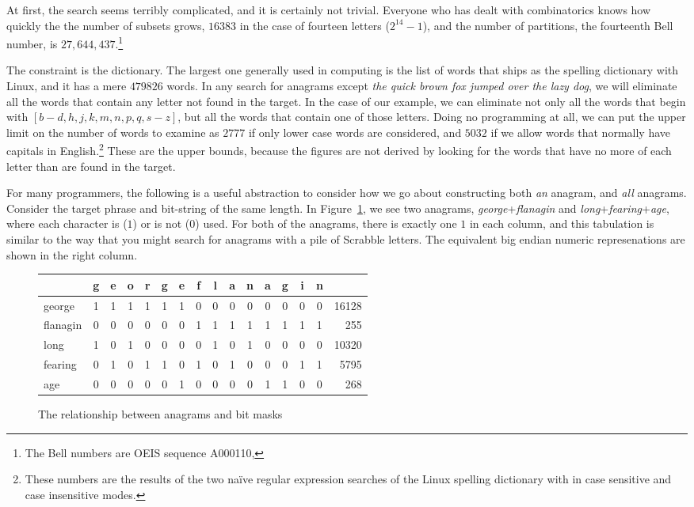 \documentclass[letterpaper, 11pt]{article}
\begin{document}
At first, the search seems terribly complicated, and it is certainly
not trivial. Everyone who has dealt with combinatorics knows how
quickly the the number of subsets grows, $16383$ in the case of
fourteen letters (\ie $2^{14}-1$), and the number of partitions, the fourteenth Bell
number, is $27,644,437$.\footnote{The Bell numbers are OEIS sequence
A000110, }

The constraint is the dictionary. The largest one generally used
in computing is the list of words that ships as the spelling
dictionary with Linux, and it has a mere $479826$ words. In any
search for anagrams except \emph{the quick brown fox jumped over
the lazy dog}, we will eliminate all the words that contain any
letter not found in the target. In the case of our example, we can
eliminate not only all the words that begin with $[b-d,h,j,k,m,n,p,q,s-z]$,
but all the words that contain one of those letters. Doing no
programming at all, we can put the upper limit on the number of
words to examine as $2777$ if only lower case words are considered,
and $5032$ if we allow words that normally have capitals in
English.\footnote{These numbers are the results of the two na\"ive
regular expression searches of the Linux spelling dictionary with
\lit{\textasciicircum[aegnfilor]\textbackslash+\$} in case sensitive
and case insensitive modes.} These are the upper bounds, because
the figures are not derived by looking for the words that have no
more of each letter than are found in the target.

For many programmers, the following is a useful abstraction to
consider how we go about constructing both \emph{an} anagram, and
\emph{all} anagrams.  Consider the target phrase and bit-string of
the same length. In Figure~\ref{fig:bitmask}, we see two anagrams,
\emph{george}+\emph{flanagin} and \emph{long}+\emph{fearing}+\emph{age},
where each character is ($1$) or is not ($0$) used. For both of the
anagrams, there is exactly one $1$ in each column, and this tabulation
is similar to the way that you might search for anagrams with a
pile of Scrabble\CircleR\xspace letters. The equivalent big endian
numeric represenations are shown in the right column.

\begin{figure}
\begin{center}
\begin{tabular}{lccccccccccccccr}
\toprule
 &g&e&o&r&g&e&f&l&a&n&a&g&i&n&\\
\midrule
george&1&1&1&1&1&1&0&0&0&0&0&0&0&0&16128\\
flanagin&0&0&0&0&0&0&1&1&1&1&1&1&1&1&255\\
\midrule
long&1&0&1&0&0&0&0&1&0&1&0&0&0&0&10320\\
fearing&0&1&0&1&1&0&1&0&1&0&0&0&1&1&5795\\
age&0&0&0&0&0&1&0&0&0&0&1&1&0&0&268\\
\bottomrule
\end{tabular}
\caption{The relationship between anagrams and bit masks}
\label{fig:bitmask}
\end{center}
\end{figure}
\end{document}
